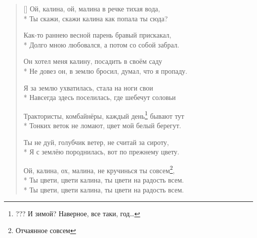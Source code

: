 \documentclass[a4paper,oneside,14pt]{scrbook}
\begin{document}
    \settowidth{\versewidth}{Ой, калина, ой, малина в речке тихая вода,}
    \begin{verse}[\versewidth]
        Ой, калина, ой, малина в речке тихая вода,\\*
        Ты скажи, скажи калина как попала ты сюда?

        Как-то раннею весной парень бравый прискакал,\\*
        Долго мною любовался, а потом со собой забрал.

        Он хотел меня калину, посадить в своём саду\\*
        Не довез он, в землю бросил, думал, что я пропаду.

        Я за землю ухватилась, стала на ноги свои\\*
        Навсегда здесь поселилась, где шебечут соловьи

        Трактористы, комбайнёры, каждый день\footnote{??? И зимой? Наверное, все таки, год\ldots} бывают тут\\*
        Тонких веток не ломают, цвет мой белый берегут.

        Ты не дуй, голубчик ветер, не считай за сироту,\\*
        Я с землёю породнилась, вот по прежнему цвету.

        Ой, калина, ох, малина, не кручинься ты совсем\footnote{Отчаянное совсем},\\*
        Ты цвети, цвети калина, ты цвети на радость всем.\\*
        Ты цвети, цвети калина, ты цвети на радость всем.    
    \end{verse}
\end{document}
